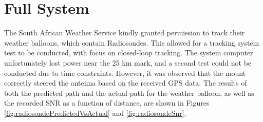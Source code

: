 \graphicspath{{./figures}}

\section{Full System}

The South African Weather Service kindly granted permission to track their weather balloons, which contain Radiosondes. This allowed for a tracking system test to be conducted, with focus on closed-loop tracking. The system computer unfortunately lost power near the 25 km mark, and a second test could not be conducted due to time constraints. However, it was observed that the mount correctly steered the antenna based on the received GPS data. The results of both the predicted path and the actual path for the weather balloon, as well as the recorded SNR as a function of distance, are shown in Figures \ref{fig:radiosondePredictedVsActual} and \ref{fig:radiosondeSnr}.

